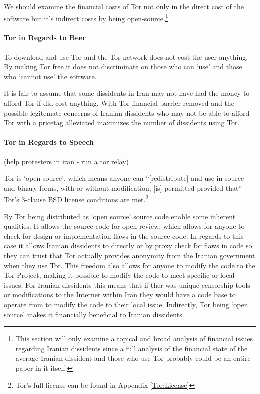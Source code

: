 \documentclass[11pt]{article}
\begin{document}
\begin{multicols}{2}
We should examine the financial costs of Tor not only in the direct cost of the
software but it's indirect costs by being open-source.\footnote{This section
  will only examine a topical and broad analysis of financial issues regarding
  Iranian dissidents since a full analysis of the financial state of the average
Iranian dissident and those who use Tor probably could be an entire paper in it
itself.}

\paragraph{Tor in Regards to Beer}

To download and use Tor and the Tor network does not cost the user anything. By
making Tor free it does not discriminate on those who can `use' and those who
`cannot use' the software. 

It is fair to assume that some dissidents in Iran may not have had the money to
afford Tor if did cost anything. With Tor financial barrier removed and the
possible legitemate concerns of Iranian dissidents who may not be able to afford
Tor with a pricetag alleviated maximizes the number of dissidents using Tor.

\paragraph{Tor in Regards to Speech}
(help protesters in iran - run a tor relay)

Tor is `open source', which means anyone can ``[redistribute] and use in source
and binary forms, with or without modification, [is] permitted provided that''
Tor's 3-clause BSD license conditions are met.\footnote{Tor's full license can
be found in Appendix \ref{Tor:License}} \cite{BSD:3-ClauseLicense,
TOR:Download, TOR:BSD-License} 

By Tor being distributed as `open source' source code enable some inherent
qualities. It allows the source code for open review, which allows for anyone to
check for design or implementation flaws in the source code. In regards to this
case it allows Iranian dissidents to directly or by proxy check for flaws in
code so they can trust that Tor actually provides anonymity from the Iranian
government when they use Tor. This freedom also allows for anyone to modify the
code to the Tor Project, making it possible to modify the code to meet specific
or local issues. For Iranian dissidents this means that if ther was unique
censorship tools or modifications to the Internet within Iran they would have a
code base to operate from to modify the code to their local issue.  Indirectly,
Tor being `open source' makes it financially beneficial to Iranian dissidents.


\end{multicols}
\end{document}
